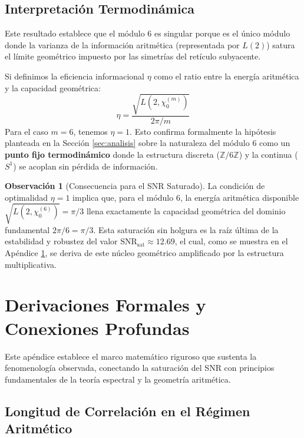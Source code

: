 \documentclass[12pt, a4paper]{article}
\theoremstyle{plain}
\theoremstyle{definition}
\newtheorem{observacion}[teorema]{Observación}
\theoremstyle{remark}
\begin{document}
\subsection{Interpretación Termodinámica}

Este resultado establece que el módulo 6 es singular porque es el único módulo donde la varianza de la información aritmética (representada por $L(2)$) satura el límite geométrico impuesto por las simetrías del retículo subyacente.

Si definimos la eficiencia informacional $\eta$ como el ratio entre la energía aritmética y la capacidad geométrica:
\[
\eta = \frac{\sqrt{L(2, \chi_0^{(m)})}}{2\pi / m}
\]
Para el caso $m=6$, tenemos $\eta = 1$. Esto confirma formalmente la hipótesis planteada en la Sección \ref{sec:analisis} sobre la naturaleza del módulo 6 como un \textbf{punto fijo termodinámico} donde la estructura discreta ($\mathbb{Z}/6\mathbb{Z}$) y la continua ($S^1$) se acoplan sin pérdida de información.

\begin{observacion}[Consecuencia para el SNR Saturado]
La condición de optimalidad $\eta = 1$ implica que, para el módulo 6, la energía aritmética disponible $\sqrt{L(2,\chi_0^{(6)})} = \pi/3$ llena exactamente la capacidad geométrica del dominio fundamental $2\pi/6 = \pi/3$. Esta saturación sin holgura es la raíz última de la estabilidad y robustez del valor $\mathrm{SNR}_{\mathrm{sat}} \approx 12.69$, el cual, como se muestra en el Apéndice \ref{ap:derivaciones_formales}, se deriva de este núcleo geométrico amplificado por la estructura multiplicativa.
\end{observacion}

\section{Derivaciones Formales y Conexiones Profundas}
\label{ap:derivaciones_formales}

Este apéndice establece el marco matemático riguroso que sustenta la fenomenología observada, conectando la saturación del SNR con principios fundamentales de la teoría espectral y la geometría aritmética.

\subsection{Longitud de Correlación en el Régimen Aritmético}
\label{ap:longitud_correlacion}
\end{document}
